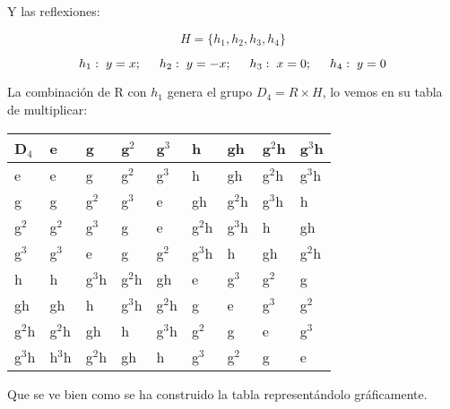 Y las reflexiones:

$$H=\lbrace h_1, h_2, h_3, h_4 \rbrace$$

$$h_1: \hspace{0.1cm} y=x; \hspace{0.5cm} h_2: \hspace{0.1cm} y=-x; \hspace{0.5cm} h_3: \hspace{0.1cm} x=0; \hspace{0.5cm} h_4: \hspace{0.1cm} y=0$$

La combinación de R con $h_1$ genera el grupo $D_4=R\times H$, lo vemos en su tabla de multiplicar:
\bigskip
\begin{center}

\begin{tabular}[b]{p{0.7cm}| p{0.7cm}p{0.7cm}p{0.7cm}p{0.7cm}p{0.7cm}p{0.7cm}p{0.7cm}p{0.7cm} }
D$_4$ & e & g & g$^2$ & g$^3$ & h & gh & g$^2$h & g$^3$h \\
\hline
e & e & g & g$^2$ & g$^3$ & h & gh & g$^2$h & g$^3$h \\
g & g & g$^2$ & g$^3$ & e & gh & g$^2$h & g$^3$h & h \\
g$^2$ & g$^2$ & g$^3$ & g & e & g$^2$h & g$^3$h & h & gh \\
g$^3$ & g$^3$ & e & g & g$^2$ & g$^3$h & h & gh & g$^2$h \\
h & h & g$^3$h & g$^2$h & gh & e & g$^3$ & g$^2$ & g \\
gh & gh & h & g$^3$h & g$^2$h & g & e & g$^3$ & g$^2$ \\
g$^2$h & g$^2$h & gh & h & g$^3$h & g$^2$ & g & e & g$^3$\\
g$^3$h & h$^3$h & g$^2$h & gh & h & g$^3$ & g$^2$ & g & e
\end{tabular}

\end{center}
\bigskip

Que se ve bien como se ha construido la tabla representándolo gráficamente.


\newpage
